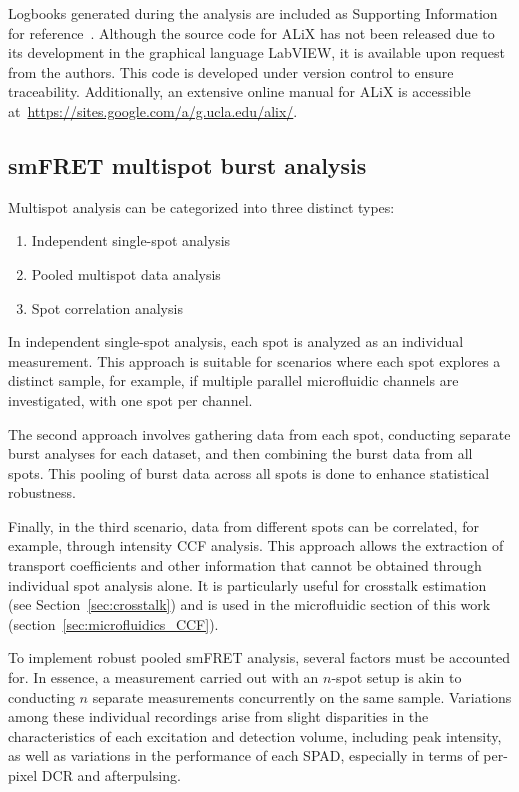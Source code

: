Logbooks generated during the analysis are included as Supporting Information for reference~\cite{figshare_repo_2019}. 
Although the source code for ALiX has not been released due to its development in the graphical language LabVIEW, it is available upon request from the authors. 
This code is developed under version control to ensure traceability. Additionally, an extensive online manual for ALiX is accessible at~\href{https://sites.google.com/a/g.ucla.edu/alix/}{https://sites.google.com/a/g.ucla.edu/alix/}.

\subsection{smFRET multispot burst analysis}
\label{sec:multispot_analysis}

Multispot analysis can be categorized into three distinct types:

\begin{enumerate}
\item Independent single-spot analysis
\item Pooled multispot data analysis
\item Spot correlation analysis
\end{enumerate}

In independent single-spot analysis, each spot is analyzed as an individual measurement. 
This approach is suitable for scenarios where each spot explores a distinct sample, for example, if multiple parallel microfluidic channels are investigated, with one spot per channel.

The second approach involves gathering data from each spot, conducting separate burst analyses for each dataset, and then combining the burst data from all spots. 
This pooling of burst data across all spots is done to enhance statistical robustness.

Finally, in the third scenario, data from different spots can be correlated, for example, through intensity \ac{CCF} analysis. 
This approach allows the extraction of transport coefficients and other information that cannot be obtained through individual spot analysis alone. 
It is particularly useful for crosstalk estimation (see Section~\ref{sec:crosstalk}) and is used in the microfluidic section of this work (section~\ref{sec:microfluidics_CCF}).

To implement robust pooled \ac{smFRET} analysis, several factors must be accounted for. 
In essence, a measurement carried out with an $n$-spot setup is akin to conducting $n$ separate measurements concurrently on the same sample. 
Variations among these individual recordings arise from slight disparities in the characteristics of each excitation and detection volume, including peak intensity, as well as variations in the performance of each \ac{SPAD}, especially in terms of per-pixel \ac{DCR} and afterpulsing.

